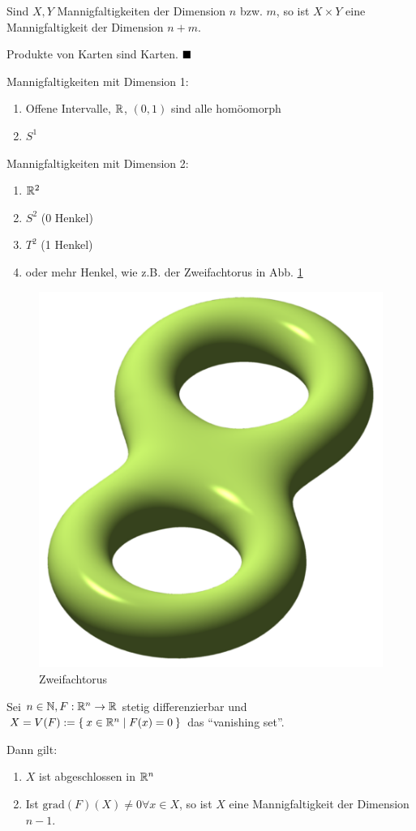 \begin{korollar}
    Sind $X, Y$ Mannigfaltigkeiten der Dimension $n$ bzw. $m$, so ist
    $X \times Y$ eine Mannigfaltigkeit der Dimension $n+m$.
\end{korollar}

\begin{beweis}
    Produkte von Karten sind Karten. $\qed$
\end{beweis}

\begin{beispiel}
    Mannigfaltigkeiten mit Dimension 1:
    \begin{enumerate}[label=\arabic*)]
        \item Offene Intervalle, $\mathbb{R}$, $(0,1)$ sind alle homöomorph
        \item $S^1$
    \end{enumerate}

    Mannigfaltigkeiten mit Dimension 2:
    \begin{enumerate}[label=\arabic*)]
        \item $\mathbb{R}^2$
        \item $S^2$ (0 Henkel)
        \item $T^2$ (1 Henkel)
        \item oder mehr Henkel, wie z.B. der Zweifachtorus in Abb. \ref{fig:double-torus}
    \end{enumerate}

    \begin{figure}
        \centering
        \includegraphics[width=0.2\linewidth, keepaspectratio]{figures/Double-torus-illustration.png}
        \caption{Zweifachtorus}
        \label{fig:double-torus}
    \end{figure}
\end{beispiel}

\begin{korollar}
    Sei $n \in \mathbb{N}, F:\mathbb{R}^n \rightarrow \mathbb{R}$ stetig differenzierbar
    und $X = V(F) := \Set{x \in \ensuremath{\mathbb{R}}^n | F(x) = 0}$ das \enquote{vanishing set}.

    Dann gilt:
    \begin{enumerate}[label=\alph*)]
        \item $X$ ist abgeschlossen in $\mathbb{R}^n$
        \item Ist $\text{grad}(F)(X) \neq 0 \forall{x \in X}$, so ist
              $X$ eine Mannigfaltigkeit der Dimension $n-1$.  \label{Mannigfaltigkeitskriterium}
    \end{enumerate}
\end{korollar}

